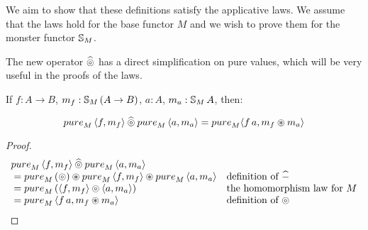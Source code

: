 We aim to show that these definitions satisfy the applicative laws.
We assume that the laws hold for the base functor $M$ and we wish to prove them for the monster functor $\mathbb{S}_{M}$.

The new operator $\mathbin{\widehat{\circledcirc}}$ has a direct simplification on pure values, which will be very useful in the proofs of the laws.
\begin{lemma}\label{lemma:pappl}
If $f:A\rightarrow B$, $m_f:\mathbb{S}_{M}\,(A\rightarrow B)$, $a:A$, $m_a:\mathbb{S}_{M}\,A$, then:

$$
\apure_M\,\langle f, m_f\rangle \alift{\pappl} \apure_M\,\langle a, m_a\rangle = \apure_M \langle f\,a, m_f \appl m_a \rangle
$$

\end{lemma}
\begin{proof}

$$
\begin{array}{ll}
\apure_M\,\langle f, m_f\rangle \alift{\pappl} \apure_M\,\langle a, m_a\rangle \\
{}= \apure_M\,(\pappl) \appl \apure_M\,\langle f, m_f\rangle \appl \apure_M\,\langle a, m_a\rangle
  & \mbox{definition of }\alift{-}\\
{}= \apure_M\,(\langle f, m_f\rangle \pappl \langle a, m_a\rangle)
  & \mbox{the homomorphism law for }M\\
{}= \apure_M\,\langle f\,a, m_f \appl m_a \rangle
  & \mbox{definition of }\pappl
\end{array}
$$
\end{proof}

